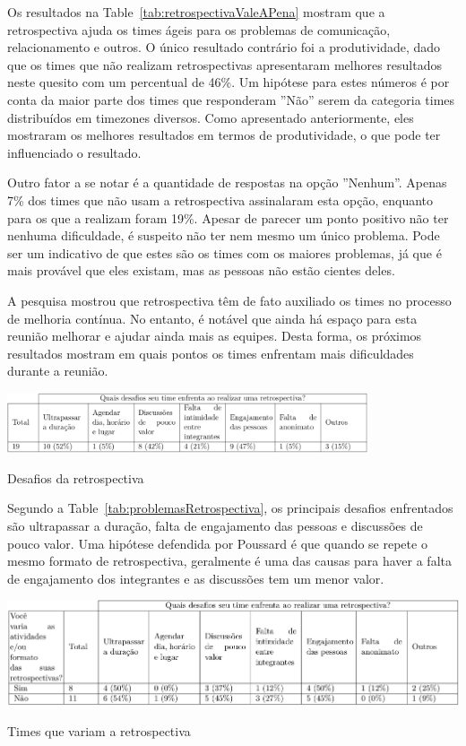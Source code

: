 \documentclass[12pt]{article}
\begin{document}
Os resultados na Table~\ref{tab:retrospectivaValeAPena} mostram que a retrospectiva ajuda os times ágeis para os problemas de comunicação, relacionamento e outros. O único resultado contrário foi a produtividade, dado que os times que não realizam retrospectivas apresentaram melhores resultados neste quesito com um percentual de 46\%. Um hipótese para estes números é por conta da maior parte dos times que responderam ''Não'' serem da categoria times distribuídos em timezones diversos. Como apresentado anteriormente, eles mostraram os melhores resultados em termos de produtividade, o que pode ter influenciado o resultado.

Outro fator a se notar é a quantidade de respostas na opção  ''Nenhum''. Apenas 7\% dos times que não usam a retrospectiva assinalaram esta opção, enquanto para os que a realizam foram 19\%. Apesar de parecer um ponto positivo não ter nenhuma dificuldade, é suspeito não ter nem mesmo um único problema. Pode ser um indicativo de que estes são os times com os maiores problemas, já que é mais provável que eles existam, mas as pessoas não estão cientes deles.

A pesquisa mostrou que retrospectiva têm de fato auxiliado os times no processo de melhoria contínua. No entanto, é notável que ainda há espaço para esta reunião melhorar e ajudar ainda mais as equipes. Desta forma, os próximos resultados mostram em quais pontos os times enfrentam mais dificuldades durante a reunião.

\begin{table}[ht]
\centering
\includegraphics[width=0.8\textwidth]{problemasRetrospectiva.png}
\caption{Desafios da retrospectiva}
\label{tab:problemasRetrospectiva}
\end{table}

Segundo a Table~\ref{tab:problemasRetrospectiva}, os principais desafios enfrentados são ultrapassar a duração, falta de engajamento das pessoas e discussões de pouco valor. Uma hipótese defendida por Poussard \cite{poussaard:14} é que quando se repete o mesmo formato de retrospectiva, geralmente é uma das causas para haver a falta de engajamento dos integrantes e as discussões tem um menor valor.

\begin{table}[ht]
\centering
\includegraphics[width=1\textwidth]{variarRetrospectiva.png}
\caption{Times que variam a retrospectiva}
\label{tab:variarRetrospectiva}
\end{table}
\end{document}
